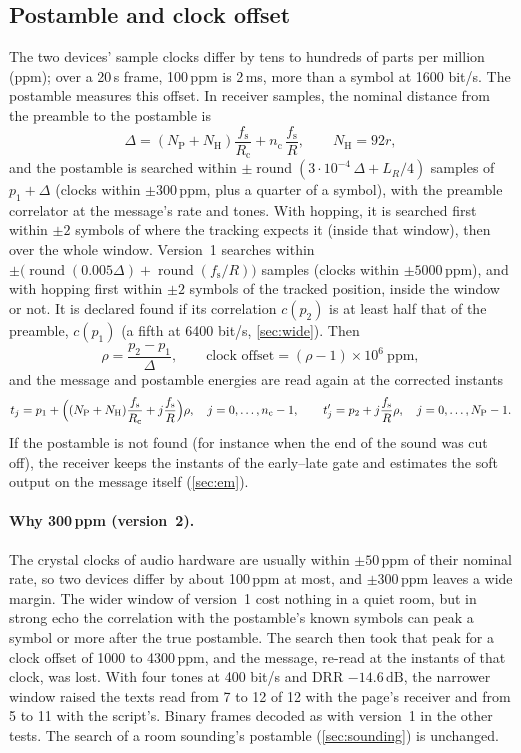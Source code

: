 \documentclass[11pt,a4paper]{article}
\newcommand{\dB}{\,\mathrm{dB}}
\newcommand{\round}[1]{\operatorname{round}\!\left(#1\right)}
\newcommand{\fs}{f_{\mathrm{s}}}
\newcommand{\Rc}{R_{\mathrm{c}}}
\newcommand{\NP}{N_{\mathrm{P}}}
\newcommand{\NH}{N_{\mathrm{H}}}
\newcommand{\nc}{n_{\mathrm{c}}}
\theoremstyle{remark}
\begin{document}
\subsection{Postamble and clock offset}
\label{sec:clock}
The two devices' sample clocks differ by tens to hundreds of parts per million (ppm); over a 20\,s frame, 100\,ppm is 2\,ms, more than a symbol at 1600 bit/s. The postamble measures this offset. In receiver samples, the nominal distance from the preamble to the postamble is
\begin{equation}
\Delta = (\NP + \NH)\frac{\fs}{\Rc} + \nc\, \frac{\fs}{R}, \qquad \NH = 92r ,
\end{equation}
and the postamble is searched within $\pm\round{3 \cdot 10^{-4}\,\Delta + L_R/4}$ samples of $p_1 + \Delta$ (clocks within $\pm 300$\,ppm, plus a quarter of a symbol), with the preamble correlator at the message's rate and tones. With hopping, it is searched first within $\pm 2$ symbols of where the tracking expects it (inside that window), then over the whole window. Version~1 searches within $\pm\bigl(\round{0.005\Delta} + \round{\fs/R}\bigr)$ samples (clocks within $\pm 5000$\,ppm), and with hopping first within $\pm 2$ symbols of the tracked position, inside the window or not. It is declared found if its correlation $c(p_2)$ is at least half that of the preamble, $c(p_1)$ (a fifth at 6400 bit/s, \cref{sec:wide}). Then
\begin{equation}
\rho = \frac{p_2 - p_1}{\Delta}, \qquad \text{clock offset} = (\rho - 1) \times 10^6\ \text{ppm},
\end{equation}
and the message and postamble energies are read again at the corrected instants
\begin{equation}
t_j = p_1 + \Bigl( (\NP + \NH)\frac{\fs}{\Rc} + j \frac{\fs}{R} \Bigr)\rho, \quad j = 0, \dots, \nc - 1, \qquad
t'_j = p_2 + j \frac{\fs}{R}\rho, \quad j = 0, \dots, \NP - 1 .
\end{equation}
If the postamble is not found (for instance when the end of the sound was cut off), the receiver keeps the instants of the early--late gate and estimates the soft output on the message itself (\cref{sec:em}).

\paragraph{Why 300\,ppm (version~2).}
The crystal clocks of audio hardware are usually within $\pm 50$\,ppm of their nominal rate, so two devices differ by about 100\,ppm at most, and $\pm 300$\,ppm leaves a wide margin. The wider window of version~1 cost nothing in a quiet room, but in strong echo the correlation with the postamble's known symbols can peak a symbol or more after the true postamble. The search then took that peak for a clock offset of 1000 to 4300\,ppm, and the message, re-read at the instants of that clock, was lost. With four tones at 400 bit/s and DRR $-14.6\dB$, the narrower window raised the texts read from 7 to 12 of 12 with the page's receiver and from 5 to 11 with the script's. Binary frames decoded as with version~1 in the other tests. The search of a room sounding's postamble (\cref{sec:sounding}) is unchanged.
\end{document}
